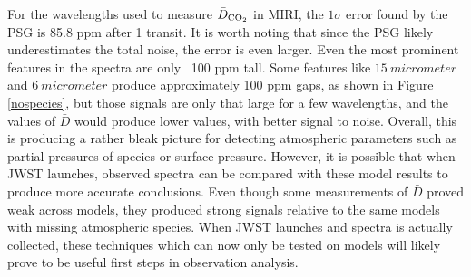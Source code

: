 For the wavelengths used to measure $\bar{D}_{\mathrm{CO_2}}$ in MIRI, the $1\sigma$
 error found by the PSG is 85.8 ppm after 1 transit. It is worth noting that
 since the PSG
 likely underestimates the total noise, the error is even larger.
 Even the most prominent features in the spectra are only ~100 ppm tall. Some
 features like $\SI{15}{micrometer}$
  and $\SI{6}{micrometer}$  produce approximately 100 ppm
 gaps, as shown
 in Figure \ref{nospecies}, but those signals are only that large for a few
 wavelengths, and the values of $\bar{D}$ would produce lower values, with
 better signal to noise. Overall, this is producing a rather bleak picture for
 detecting atmospheric parameters such as partial pressures of species or
 surface pressure. However, it is possible that when JWST launches,
 observed spectra can be compared with these model results to produce more
 accurate conclusions. Even though some measurements of $\bar{D}$ proved weak
 across models, they produced strong signals relative to the same models with
 missing atmospheric species. When JWST launches and spectra is actually
 collected, these techniques which can now only be tested on models will likely
 prove to be useful first steps in observation analysis.
